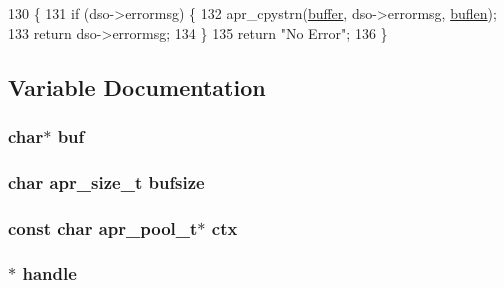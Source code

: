 \begin{DoxyCode}
130 \{
131     \textcolor{keywordflow}{if} (dso->errormsg) \{
132         apr\_cpystrn(\hyperlink{group__APACHE__CORE__PROTO_gabd91b1aab0a10c5027ca2eb5577f759f}{buffer}, dso->errormsg, \hyperlink{group__APACHE__CORE__DAEMON_ga71e9cfb174fb4be19396f3f3d1b25bee}{buflen});
133         \textcolor{keywordflow}{return} dso->errormsg;
134     \}
135     \textcolor{keywordflow}{return} \textcolor{stringliteral}{"No Error"};
136 \}
\end{DoxyCode}


\subsection{Variable Documentation}
\subsubsection[{\texorpdfstring{buf}{buf}}]{\setlength{\rightskip}{0pt plus 5cm}char$\ast$ buf}\hypertarget{group__apr__dso_ga1fe855c208bc17a51a4d34fefdb2d5b1}{}\label{group__apr__dso_ga1fe855c208bc17a51a4d34fefdb2d5b1}
\subsubsection[{\texorpdfstring{bufsize}{bufsize}}]{\setlength{\rightskip}{0pt plus 5cm}char {\bf apr\+\_\+size\+\_\+t} bufsize}\hypertarget{group__apr__dso_gaacff821b2b2a35a43f6b1db27538e122}{}\label{group__apr__dso_gaacff821b2b2a35a43f6b1db27538e122}
\subsubsection[{\texorpdfstring{ctx}{ctx}}]{\setlength{\rightskip}{0pt plus 5cm}const char {\bf apr\+\_\+pool\+\_\+t}$\ast$ ctx}\hypertarget{group__apr__dso_ga3cb0653efd70b0c2ca423361b4ff5810}{}\label{group__apr__dso_ga3cb0653efd70b0c2ca423361b4ff5810}
\subsubsection[{\texorpdfstring{handle}{handle}}]{$\ast$ handle}\hypertarget{group__apr__dso_ga7f148a82ac737c4782f73a9315c1c14b}{}\label{group__apr__dso_ga7f148a82ac737c4782f73a9315c1c14b}
